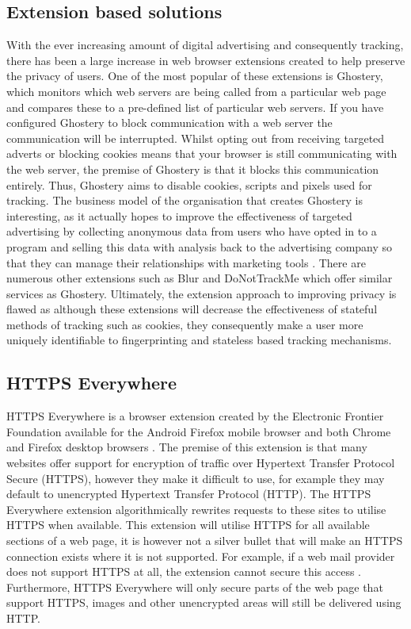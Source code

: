 \documentclass[12pt]{article}
\begin{document}
\subsection{Extension based solutions}
With the ever increasing amount of digital advertising and consequently tracking, there has been a large increase in web browser extensions created to help preserve the privacy of users. One of the most popular of these extensions is Ghostery, which monitors which web servers are being called from a particular web page and compares these to a pre-defined list of particular web servers. If you have configured Ghostery to block communication with a web server the communication will be interrupted. Whilst opting out from receiving targeted adverts or blocking cookies means that your browser is still communicating with the web server, the premise of Ghostery is that it blocks this communication entirely. Thus, Ghostery aims to disable cookies, scripts and pixels used for tracking. The business model of the organisation that creates Ghostery is interesting, as it actually hopes to improve the effectiveness of targeted advertising by collecting anonymous data from users who have opted in to a program and selling this data with analysis back to the advertising company so that they can manage their relationships with marketing tools \parencite{ghostery}. There are numerous other extensions such as Blur and DoNotTrackMe which offer similar services as Ghostery. Ultimately, the extension approach to improving privacy is flawed as although these extensions will decrease the effectiveness of stateful methods of tracking such as cookies, they consequently make a user more uniquely identifiable to fingerprinting and stateless based tracking mechanisms.

\subsection{HTTPS Everywhere}
HTTPS Everywhere is a browser extension created by the Electronic Frontier Foundation available for the Android Firefox mobile browser and both Chrome and Firefox desktop browsers \parencite{httpsEverywhere}. The premise of this extension is that many websites offer support for encryption of traffic over Hypertext Transfer Protocol Secure (HTTPS), however they make it difficult to use, for example they may default to unencrypted  Hypertext Transfer Protocol (HTTP). The HTTPS Everywhere extension algorithmically rewrites requests to these sites to utilise HTTPS when available. This extension will utilise HTTPS for all available sections of a web page, it is however not a silver bullet that will make an HTTPS connection exists where it is not supported. For example, if a web mail provider does not support HTTPS at all, the extension cannot secure this access \parencite{httpsEverywhere}. Furthermore, HTTPS Everywhere will only secure parts of the web page that support HTTPS, images and other unencrypted areas will still be delivered using HTTP.  \\
\end{document}
